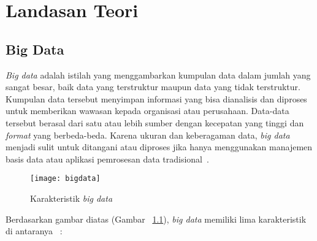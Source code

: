 \chapter{Landasan Teori}
\label{chap:teori}

\section{Big Data}
\label{sec:big data}

{\it Big data} adalah istilah yang menggambarkan kumpulan data dalam jumlah yang sangat besar, baik data yang terstruktur maupun data yang tidak terstruktur. Kumpulan data tersebut menyimpan informasi yang bisa dianalisis dan diproses untuk memberikan wawasan kepada organisasi atau perusahaan. Data-data tersebut berasal dari satu atau lebih sumber  dengan kecepatan yang tinggi dan \textit{format} yang berbeda-beda. Karena ukuran dan keberagaman data, {\it big data} menjadi sulit untuk ditangani atau diproses jika hanya menggunakan manajemen basis data atau aplikasi pemrosesan data tradisional~\cite{ishwarappa:01:bgintro}.\\


\begin{figure}[H]
    \centering  
    \texttt{[image: bigdata]}  
    \caption[Karakteristik {\it big data} ]{Karakteristik {\it big data}} 
    \label{fig:bigdata} 
\end{figure}

Berdasarkan gambar diatas (Gambar ~\ref{fig:bigdata}), \textit{big data} memiliki lima karakteristik di antaranya ~\cite{ishwarappa:01:bgintro}:

